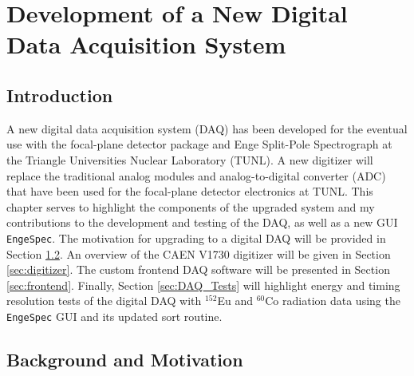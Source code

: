 \chapter{Development of a New Digital Data Acquisition System}
\label{ch:DAQ}


\section{Introduction}

A new digital data acquisition system (DAQ) has been developed for the eventual use with the focal-plane detector package \cite{Marshall2019} and Enge Split-Pole Spectrograph at the Triangle Universities Nuclear Laboratory (TUNL). A new digitizer will replace the traditional analog modules and analog-to-digital converter (ADC) that have been used for the focal-plane detector electronics at TUNL. This chapter serves to highlight the components of the upgraded system and my contributions to the development and testing of the DAQ, as well as a new GUI \texttt{EngeSpec}. The motivation for upgrading to a digital DAQ will be provided in Section \ref{sec:motivation}. An overview of the CAEN V1730 digitizer will be given in Section \ref{sec:digitizer}. The custom frontend DAQ software will be presented in Section \ref{sec:frontend}. %
Finally, Section \ref{sec:DAQ_Tests} will highlight energy and timing resolution tests of the digital DAQ with $^{152}$Eu and $^{60}$Co radiation data using the \texttt{EngeSpec} GUI and its updated sort routine.



\section{Background and Motivation} \label{sec:motivation}



